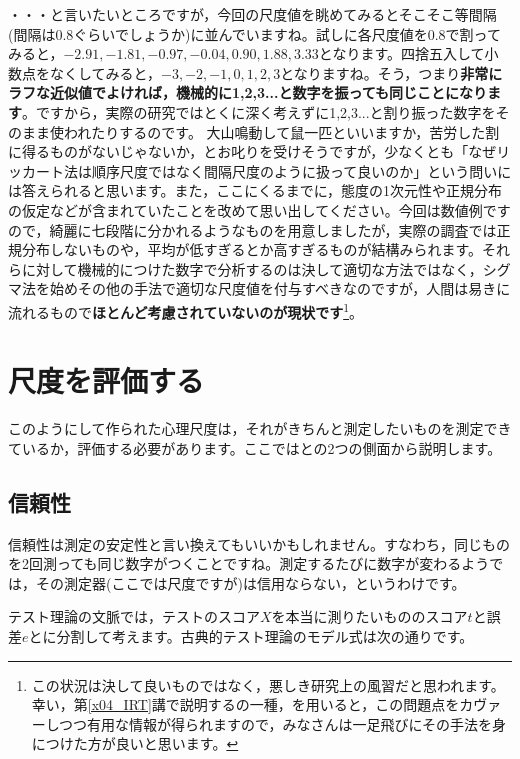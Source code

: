 \documentclass{ltjsbook}
\begin{document}
・・・と言いたいところですが，今回の尺度値を眺めてみるとそこそこ等間隔(間隔は$0.8$ぐらいでしょうか)に並んでいますね。試しに各尺度値を0.8で割ってみると，$-2.91,-1.81,-0.97, -0.04,0.90, 1.88, 3.33$となります。四捨五入して小数点をなくしてみると，$-3,-2,-1,0,1,2,3$となりますね。そう，つまり\textbf{非常にラフな近似値でよければ，機械的に1,2,3...と数字を振っても同じことになります}。ですから，実際の研究ではとくに深く考えずに1,2,3...と割り振った数字をそのまま使われたりするのです。
大山鳴動して鼠一匹といいますか，苦労した割に得るものがないじゃないか，とお叱りを受けそうですが，少なくとも「なぜリッカート法は順序尺度ではなく間隔尺度のように扱って良いのか」という問いには答えられると思います。また，ここにくるまでに，態度の1次元性や正規分布の仮定などが含まれていたことを改めて思い出してください。今回は数値例ですので，綺麗に七段階に分かれるようなものを用意しましたが，実際の調査では正規分布しないものや，平均が低すぎるとか高すぎるものが結構みられます。それらに対して機械的につけた数字で分析するのは決して適切な方法ではなく，シグマ法を始めその他の手法で適切な尺度値を付与すべきなのですが，人間は易きに流れるもので\textbf{ほとんど考慮されていないのが現状です}\footnote{この状況は決して良いものではなく，悪しき研究上の風習だと思われます。幸い，第\ref{x04_IRT}講で説明するの一種，を用いると，この問題点をカヴァーしつつ有用な情報が得られますので，みなさんは一足飛びにその手法を身につけた方が良いと思います。}。

\section{尺度を評価する}
このようにして作られた心理尺度は，それがきちんと測定したいものを測定できているか，評価する必要があります。ここではとの2つの側面から説明します。
\subsection{信頼性}
信頼性は測定の安定性と言い換えてもいいかもしれません。すなわち，同じものを2回測っても同じ数字がつくことですね。測定するたびに数字が変わるようでは，その測定器(ここでは尺度ですが)は信用ならない，というわけです。

テスト理論の文脈では，テストのスコア$X$を本当に測りたいもののスコア$t$と誤差$e$とに分割して考えます。古典的テスト理論のモデル式は次の通りです。
\end{document}
